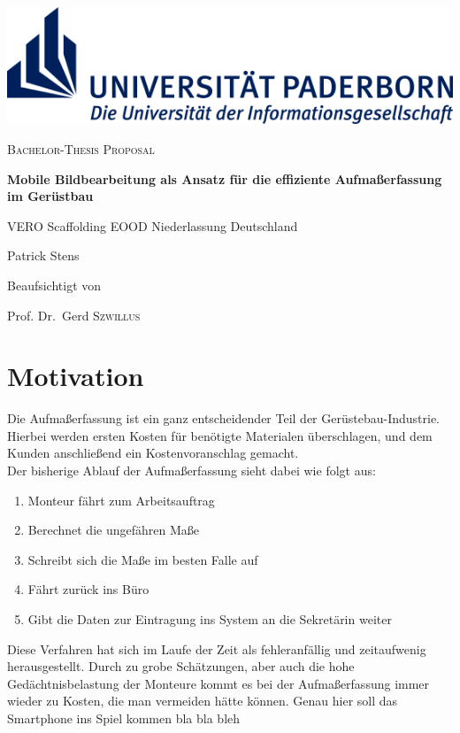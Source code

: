 \documentclass[a4paper]{article}
\begin{document}
\renewcommand{\refname}{Literature}

\begin{titlepage}
	\centering
	\includegraphics[width=\textwidth]{logo}
	\par\vspace{5cm}

	{\scshape\Large Bachelor-Thesis Proposal\par}
	\vspace{1cm}

	{\huge\bfseries Mobile Bildbearbeitung als Ansatz für die effiziente Aufmaßerfassung im Gerüstbau\par}
	\vspace{2cm}

	{\large VERO Scaffolding EOOD Niederlassung Deutschland\par}

	{\Large Patrick Stens\par}

	\vfill

	Beaufsichtigt von\par
	Prof. Dr.~Gerd \textsc{Szwillus}	

\end{titlepage}

\section{Motivation}
Die Aufmaßerfassung ist ein ganz entscheidender Teil der Gerüstebau-Industrie. 
Hierbei werden ersten Kosten für benötigte Materialen überschlagen, und dem Kunden anschließend ein Kostenvoranschlag gemacht. \\ 
Der bisherige Ablauf der Aufmaßerfassung sieht dabei wie folgt aus:
\begin{enumerate}
	\item Monteur fährt zum Arbeitsauftrag 
	\item Berechnet die ungefähren Maße
	\item Schreibt sich die Maße im besten Falle auf
	\item Fährt zurück ins Büro
	\item Gibt die Daten zur Eintragung ins System an die Sekretärin weiter
\end{enumerate}

Diese Verfahren hat sich im Laufe der Zeit als fehleranfällig und zeitaufwenig herausgestellt.
Durch zu grobe Schätzungen, aber auch die hohe Gedächtnisbelastung der Monteure kommt es bei der Aufmaßerfassung immer wieder zu Kosten, die man vermeiden hätte können. 
Genau hier soll das Smartphone ins Spiel kommen bla bla bleh
\end{document}
